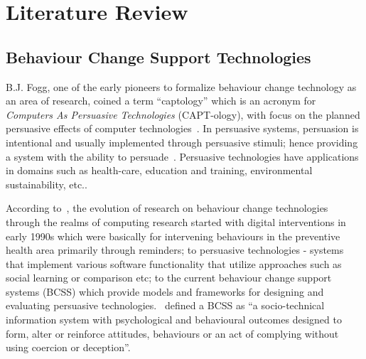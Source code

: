 
\chapter{Literature Review} %

\label{literaturereview} %


\section{Behaviour Change Support Technologies}
B.J. Fogg, one of the early pioneers to formalize behaviour change technology as an area of research, coined a term “captology” which is an acronym for \emph{Computers As Persuasive Technologies} (CAPT-ology), with focus on the planned persuasive effects of computer technologies~\citep{fogg1999persuasive}. In persuasive systems, persuasion is intentional and usually implemented through persuasive stimuli; hence providing a system with the ability to persuade~\citep{hamari2014persuasive}. Persuasive technologies have applications in domains such as health-care, education and training, environmental sustainability, etc..

According to~\cite{langrial2012digital}, the evolution of research on behaviour change technologies through the realms of computing research started with digital interventions in early 1990s which were basically for intervening behaviours in the preventive health area primarily through reminders; to persuasive technologies - systems that implement various software functionality that utilize approaches such as social learning or comparison etc; to the current behaviour change support systems (BCSS) which provide models and frameworks for designing and evaluating persuasive technologies.~\cite{Oinas-Kukkonen:foundation} defined a BCSS  as ``a socio-technical information system with psychological and behavioural outcomes designed to form, alter or reinforce attitudes, behaviours or an act of complying without using coercion or deception''.

